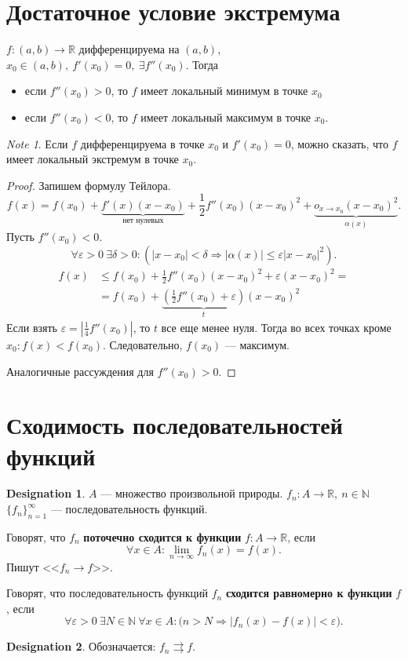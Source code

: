 \documentclass[11pt]{book}
\newcommand{\N}{\mathbb{N}}
\newcommand{\R}{\mathbb{R}}
\renewcommand{\le}{\leqslant}
\theoremstyle{definition}
\theoremstyle{plain}
\theoremstyle{plain}
\theoremstyle{definition}
\newtheorem*{name}{Designation}
\theoremstyle{remark}
\newtheorem*{note}{Note}
\begin{document}
\section{Достаточное условие экстремума}
\begin{thm}
    $ f: (a, b) \to  \R$ дифференцируема на $ (a, b)$,  $ x_0 \in (a, b), ~ f'(x_0) = 0, ~ \exists f''(x_0)$. Тогда
    \begin{itemize}
	\item если $ f''(x_0) >0$, то $ f$ имеет локальный минимум в точке $ x_0$
	\item если $ f''(x_0) <0$, то $ f$ имеет локальный максимум в точке $ x_0$.
    \end{itemize}
    \begin{note}
	Если $ f$ дифференцируема в точке $ x_0$ и $ f'(x_0) = 0$, можно сказать, что $ f$ имеет локальный экстремум в точке $ x_0$.
    \end{note}
\end{thm}
\begin{proof}
    Запишем формулу Тейлора.
    \[
	f(x) = f(x_0) + \underbrace{f'(x)(x-x_0)}_{\text{нет нулевых}} + \frac{1}{2}f''(x_0)(x-x_0)^2 + \underbrace{o_{x \to  x_0}(x-x_0)^2}_{\alpha(x)}
    .\] 
    Пусть $ f''(x_0) <0$.
    \[
	\forall \varepsilon >0 ~ \exists \delta >0: \left(|x - x_0| < \delta \Longrightarrow |\alpha(x)| \le \varepsilon |x-x_0|^2\right)
    .\] 
    \[
	\begin{aligned}
	    f(x) & \le f(x_0) + \frac{1}{2}f''(x_0)(x-x_0)^2 + \varepsilon (x-x_0)^2 = \\
		 &= f(x_0) + \underbrace{\left( \frac{1}{2}f''(x_0) + \varepsilon  \right)}_{t} (x-x_0)^2
	\end{aligned}
    \] 
    Если взять $ \varepsilon = \left| \frac{1}{4} f''(x_0) \right| $, то $ t$ все еще менее нуля.
    Тогда во всех точках кроме $ x_0: f(x) < f(x_0)$. Следовательно, $ f(x_0)$ --- максимум.

    Аналогичные рассуждения для $ f''(x_0) > 0$.
\end{proof}
\section{Сходимость последовательностей функций}
\begin{name}
    $ A$ --- множество произвольной природы.  $ f_n: A \to  \R, ~ n \in \N$
    $ \{f_n\}_{n=1}^{\infty}$ --- последовательность функций.
\end{name}
\begin{defn}
    Говорят, что $ f_n$ {\bf поточечно сходится к функции}  $ f: A \to  \R$, если \[
	\forall x \in A: \lim_{n \to \infty} f_n(x) = f(x)
    .\] 
    Пишут <<$ f_n \to  f$>>.
\end{defn}
\begin{defn}
    Говорят, что последовательность функций $ f_n$ {\bf  сходится равномерно к функции} $ f$, если 
    \[
	\forall \varepsilon >0 ~ \exists N \in \N ~ \forall x \in A: \bigl( n> N \Longrightarrow |f_n(x) - f(x)| < \varepsilon \bigr)
    .\] 
    \begin{name}
        Обозначается: $ f_n \rightrightarrows f$.
    \end{name}
\end{defn}
\end{document}
